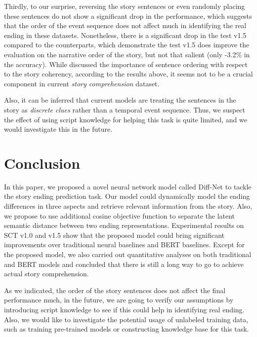 \documentclass[letterpaper]{article} %
\begin{document}
Thirdly, to our surprise, reversing the story sentences or even randomly placing these sentences do not show a significant drop in the performance, which suggests that the order of the event sequence does not affect much in identifying the real ending in these datasets.
Nonetheless, there is a significant drop in the test v1.5 compared to the counterparts, which demonstrate the test v1.5 does improve the evaluation on the narrative order of the story, but not that salient (only -3.2\% in the accuracy). 
While \citeauthor{chen-etal-2016-order}  discussed the importance of sentence ordering with respect to the story coherency, according to the results above, it seems not to be a crucial component in current {\em story comprehension} dataset.

Also, it can be inferred that current models are treating the sentences in the story as {\em discrete clues} rather than a temporal event sequence. Thus, we suspect the effect of using script knowledge for helping this task is quite limited, and we would investigate this in the future.



\section{Conclusion}\label{conclusion}
In this paper, we proposed a novel neural network model called Diff-Net to tackle the story ending prediction task.
Our model could dynamically model the ending differences in three aspects and retrieve relevant information from the story.
Also, we propose to use additional cosine objective function to separate the latent semantic distance between two ending representations.
Experimental results on SCT v1.0 and v1.5 show that the proposed model could bring significant improvements over traditional neural baselines and BERT baselines.
Except for the proposed model, we also carried out quantitative analyses on both traditional and BERT models and concluded that there is still a long way to go to achieve actual story comprehension.

As we indicated, the order of the story sentences does not affect the final performance much, in the future, we are going to verify our assumptions by introducing script knowledge to see if this could help in identifying real ending. 
Also, we would like to investigate the potential usage of unlabeled training data, such as training pre-trained models or constructing knowledge base for this task. 
\end{document}
